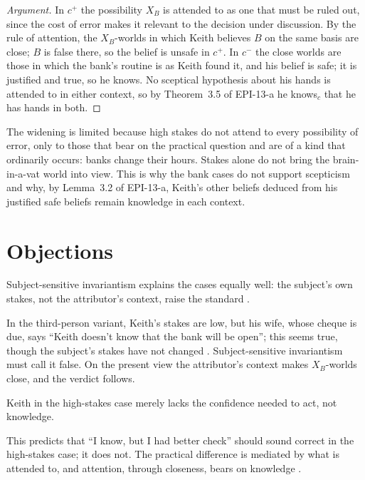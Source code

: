 \documentclass{situationist-preprint}
\begin{document}
\begin{proof}[Argument]
In $c^{+}$ the possibility $X_B$ is attended to as one that must be ruled out, since the cost of error makes it relevant to the decision under discussion. By the rule of attention, the $X_B$-worlds in which Keith believes $B$ on the same basis are close; $B$ is false there, so the belief is unsafe in $c^{+}$. In $c^{-}$ the close worlds are those in which the bank's routine is as Keith found it, and his belief is safe; it is justified and true, so he knows. No sceptical hypothesis about his hands is attended to in either context, so by Theorem~3.5 of EPI-13-a he knows$_c$ that he has hands in both.
\end{proof}

The widening is limited because high stakes do not attend to every possibility of error, only to those that bear on the practical question and are of a kind that ordinarily occurs: banks change their hours. Stakes alone do not bring the brain-in-a-vat world into view. This is why the bank cases do not support scepticism and why, by Lemma~3.2 of EPI-13-a, Keith's other beliefs deduced from his justified safe beliefs remain knowledge in each context.

\section{Objections}

\begin{objection}
Subject-sensitive invariantism explains the cases equally well: the subject's own stakes, not the attributor's context, raise the standard \citep{Stanley2005}.
\end{objection}

\begin{reply}
In the third-person variant, Keith's stakes are low, but his wife, whose cheque is due, says \enquote{Keith doesn't know that the bank will be open}; this seems true, though the subject's stakes have not changed \citep{DeRose1992}. Subject-sensitive invariantism must call it false. On the present view the attributor's context makes $X_B$-worlds close, and the verdict follows.
\end{reply}

\begin{objection}
Keith in the high-stakes case merely lacks the confidence needed to act, not knowledge.
\end{objection}

\begin{reply}
This predicts that \enquote{I know, but I had better check} should sound correct in the high-stakes case; it does not. The practical difference is mediated by what is attended to, and attention, through closeness, bears on knowledge \citep{Cohen1999}.
\end{reply}
\end{document}
